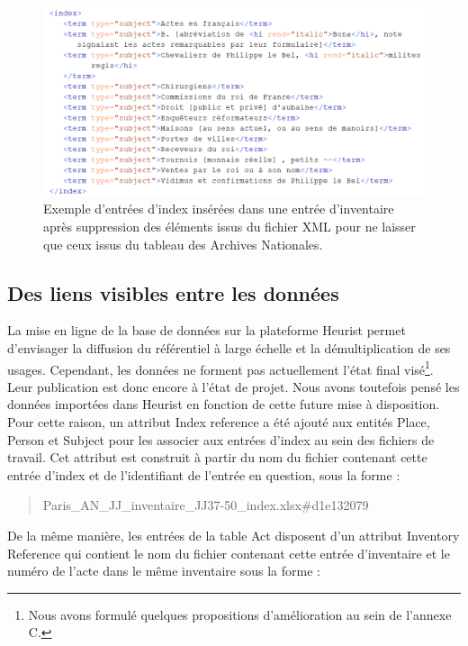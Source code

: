 \documentclass[a4paper,12pt,twoside]{book}
\begin{document}
	\begin{figure}
		\centering
		\includegraphics[width=\textwidth]{Images/Subects_in_inventaire.png}
		\caption{Exemple d'entrées d'index insérées dans une entrée d'inventaire après suppression des éléments issus du fichier XML pour ne laisser que ceux issus du tableau des Archives Nationales.}
		\label{Subjects_in_inventory}
	\end{figure}
	
	\subsection{Des liens visibles entre les données}
	
	La mise en ligne de la base de données sur la plateforme Heurist permet d'envisager la diffusion du référentiel à large échelle et la démultiplication de ses usages. Cependant, les données ne forment pas actuellement l'état final visé\footnote{Nous avons formulé quelques propositions d'amélioration au sein de l'annexe C.}. Leur publication est donc encore à l'état de projet. Nous avons toutefois pensé les données importées dans Heurist en fonction de cette future mise à disposition. Pour cette raison, un attribut \og Index reference\fg{} a été ajouté aux entités Place, Person et Subject pour les associer aux entrées d'index au sein des fichiers de travail. Cet attribut est construit à partir du nom du fichier contenant cette entrée d'index et de l'identifiant de l'entrée en question, sous la forme :
	
	
	\begin{quotation}
		Paris\_AN\_JJ\_inventaire\_JJ37-50\_index.xlsx\#d1e132079
	\end{quotation}
	
	De la même manière, les entrées de la table Act disposent d'un attribut \og Inventory Reference\fg{} qui contient le nom du fichier contenant cette entrée d'inventaire et le numéro de l'acte dans le même inventaire sous la forme :
	
\end{document}
